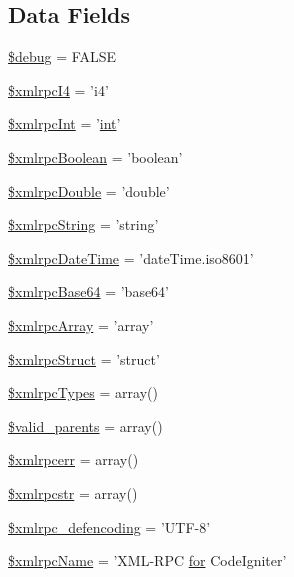 \subsection*{Data Fields}
\begin{DoxyCompactItemize}
\item 
\hyperlink{class_c_i___xmlrpc_a85ae3e64cd40e9564adceb010085e9dd}{\$debug} = F\-A\-L\-S\-E
\item 
\hyperlink{class_c_i___xmlrpc_a4d41d61a02c60406c56254f0988b8141}{\$xmlrpc\-I4} = 'i4'
\item 
\hyperlink{class_c_i___xmlrpc_a1bf451bf41226cf1702f54fa46b041f2}{\$xmlrpc\-Int} = '\hyperlink{mathquill_8js_a61569f2965b7a369eb10b6d75d410d11}{int}'
\item 
\hyperlink{class_c_i___xmlrpc_abb241cb9cac2595c7ef28106808ec438}{\$xmlrpc\-Boolean} = 'boolean'
\item 
\hyperlink{class_c_i___xmlrpc_aa412c6bea7572d0e508b5ef9d2213db3}{\$xmlrpc\-Double} = 'double'
\item 
\hyperlink{class_c_i___xmlrpc_a69f8b2c87014597d1f5509ec934ceeea}{\$xmlrpc\-String} = 'string'
\item 
\hyperlink{class_c_i___xmlrpc_ad0ef2c8353643b73afe4636a5fb84cff}{\$xmlrpc\-Date\-Time} = 'date\-Time.\-iso8601'
\item 
\hyperlink{class_c_i___xmlrpc_a95dc3164d1c3e1fdaf7185095fb376ae}{\$xmlrpc\-Base64} = 'base64'
\item 
\hyperlink{class_c_i___xmlrpc_aedecd71f2438e9a44a8f5a1dc73f4c7a}{\$xmlrpc\-Array} = 'array'
\item 
\hyperlink{class_c_i___xmlrpc_a9a499285050ed5c867eec71854231f01}{\$xmlrpc\-Struct} = 'struct'
\item 
\hyperlink{class_c_i___xmlrpc_a2b937e1ca5ee8495f0251a74222cec64}{\$xmlrpc\-Types} = array()
\item 
\hyperlink{class_c_i___xmlrpc_a801945a338a9dee5f723c00cb71657b7}{\$valid\-\_\-parents} = array()
\item 
\hyperlink{class_c_i___xmlrpc_a915a90a791db11a94f665567d2f5ad01}{\$xmlrpcerr} = array()
\item 
\hyperlink{class_c_i___xmlrpc_a89bbdd6a565dd3af2378b44fc5f156a0}{\$xmlrpcstr} = array()
\item 
\hyperlink{class_c_i___xmlrpc_a7a31af447cebbb81b1f3c5581cd90d5a}{\$xmlrpc\-\_\-defencoding} = 'U\-T\-F-\/8'
\item 
\hyperlink{class_c_i___xmlrpc_a1311a8891b845bf89b1bc459d54a6312}{\$xmlrpc\-Name} = 'X\-M\-L-\/R\-P\-C \hyperlink{mathquill_8js_a6051bae356f28cb834303745ad2f4d86}{for} Code\-Igniter'

\end{DoxyCompactItemize}

